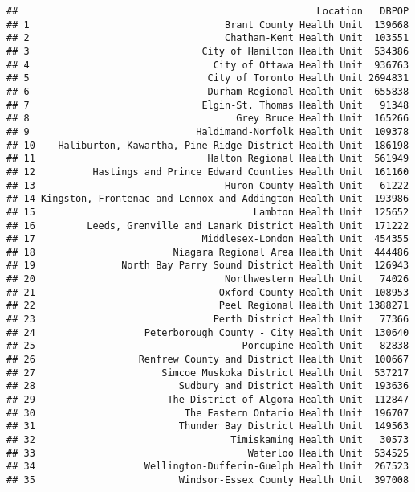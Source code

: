 \documentclass[]{article}
\begin{document}
\begin{verbatim}
##                                                    Location   DBPOP
## 1                                  Brant County Health Unit  139668
## 2                                  Chatham-Kent Health Unit  103551
## 3                              City of Hamilton Health Unit  534386
## 4                                City of Ottawa Health Unit  936763
## 5                               City of Toronto Health Unit 2694831
## 6                               Durham Regional Health Unit  655838
## 7                              Elgin-St. Thomas Health Unit   91348
## 8                                    Grey Bruce Health Unit  165266
## 9                             Haldimand-Norfolk Health Unit  109378
## 10    Haliburton, Kawartha, Pine Ridge District Health Unit  186198
## 11                              Halton Regional Health Unit  561949
## 12          Hastings and Prince Edward Counties Health Unit  161160
## 13                                 Huron County Health Unit   61222
## 14 Kingston, Frontenac and Lennox and Addington Health Unit  193986
## 15                                      Lambton Health Unit  125652
## 16         Leeds, Grenville and Lanark District Health Unit  171222
## 17                             Middlesex-London Health Unit  454355
## 18                        Niagara Regional Area Health Unit  444486
## 19               North Bay Parry Sound District Health Unit  126943
## 20                                 Northwestern Health Unit   74026
## 21                                Oxford County Health Unit  108953
## 22                                Peel Regional Health Unit 1388271
## 23                               Perth District Health Unit   77366
## 24                   Peterborough County - City Health Unit  130640
## 25                                    Porcupine Health Unit   82838
## 26                  Renfrew County and District Health Unit  100667
## 27                      Simcoe Muskoka District Health Unit  537217
## 28                         Sudbury and District Health Unit  193636
## 29                       The District of Algoma Health Unit  112847
## 30                          The Eastern Ontario Health Unit  196707
## 31                         Thunder Bay District Health Unit  149563
## 32                                  Timiskaming Health Unit   30573
## 33                                     Waterloo Health Unit  534525
## 34                   Wellington-Dufferin-Guelph Health Unit  267523
## 35                         Windsor-Essex County Health Unit  397008

\end{verbatim}
\end{document}
